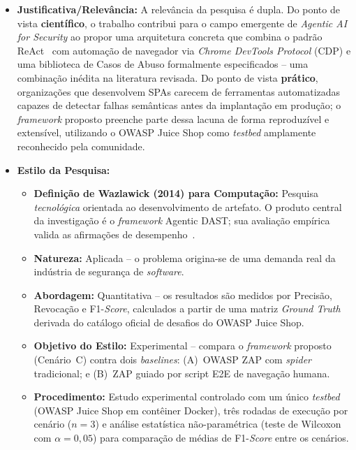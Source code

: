 \documentclass[12pt, a4paper]{article}
\begin{document}
\begin{itemize}
  \item \textbf{Justificativa/Relevância:}
  A relevância da pesquisa é dupla.
  Do ponto de vista \textbf{científico}, o trabalho contribui para o campo emergente de \textit{Agentic AI for Security} ao propor uma arquitetura concreta que combina o padrão ReAct~\cite{yao2023react} com automação de navegador via \textit{Chrome DevTools Protocol} (CDP) e uma biblioteca de Casos de Abuso formalmente especificados -- uma combinação inédita na literatura revisada.
  Do ponto de vista \textbf{prático}, organizações que desenvolvem SPAs carecem de ferramentas automatizadas capazes de detectar falhas semânticas antes da implantação em produção; o \textit{framework} proposto preenche parte dessa lacuna de forma reproduzível e extensível, utilizando o OWASP Juice Shop como \textit{testbed} amplamente reconhecido pela comunidade.

  \item \textbf{Estilo da Pesquisa:}
  \begin{itemize}
    \item[(a)] \textbf{Definição de Wazlawick (2014) para Computação:} Pesquisa \textit{tecnológica} orientada ao desenvolvimento de artefato. O produto central da investigação é o \textit{framework} Agentic DAST; sua avaliação empírica valida as afirmações de desempenho~\cite{wazlawick2014}.
    \item[(b)] \textbf{Natureza:} Aplicada -- o problema origina-se de uma demanda real da indústria de segurança de \textit{software}.
    \item[(c)] \textbf{Abordagem:} Quantitativa -- os resultados são medidos por Precisão, Revocação e F1-\textit{Score}, calculados a partir de uma matriz \textit{Ground Truth} derivada do catálogo oficial de desafios do OWASP Juice Shop.
    \item[(d)] \textbf{Objetivo do Estilo:} Experimental -- compara o \textit{framework} proposto (Cenário~C) contra dois \textit{baselines}: (A)~OWASP ZAP com \textit{spider} tradicional; e (B)~ZAP guiado por script E2E de navegação humana.
    \item[(e)] \textbf{Procedimento:} Estudo experimental controlado com um único \textit{testbed} (OWASP Juice Shop em contêiner Docker), três rodadas de execução por cenário ($n = 3$) e análise estatística não-paramétrica (teste de Wilcoxon com $\alpha = 0{,}05$) para comparação de médias de F1-\textit{Score} entre os cenários.
  \end{itemize}

\end{itemize}
\end{document}
